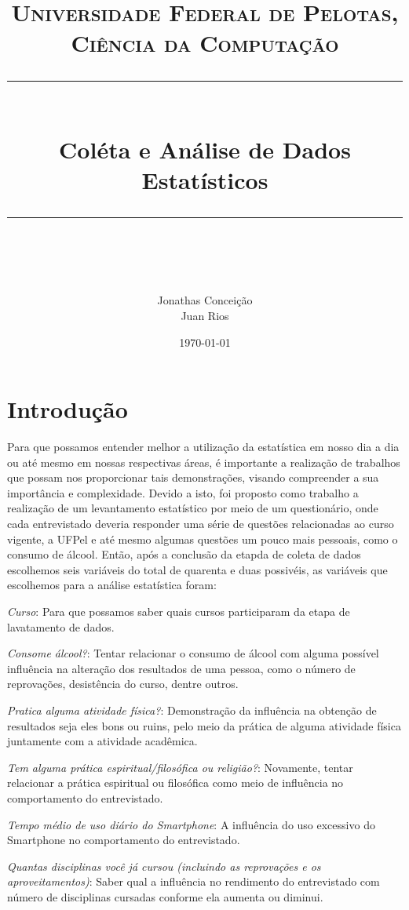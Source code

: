 \documentclass[11pt]{scrartcl} %
\title{
  \normalfont\normalsize
  \textsc{Universidade Federal de Pelotas, Ciência da Computação}\\ %
  \vspace{25pt} %
  \rule{\linewidth}{0.5pt}\\ %
  \vspace{20pt} %
  {\huge Coléta e Análise de Dados Estatísticos}\\ %
  \vspace{12pt} %
  \rule{\linewidth}{2pt}\\ %
  \vspace{12pt} %
}
\author{
  \LARGE Jonathas Conceição\\
  \LARGE Juan Rios
}
\date{\normalsize\today} %
\begin{document}
\maketitle %


\section{Introdução}

Para que possamos entender melhor a utilização da estatística em nosso dia a dia ou até mesmo em nossas respectivas áreas, é importante a realização de trabalhos que possam nos proporcionar tais demonstrações, visando compreender a sua importância e complexidade. Devido a isto, foi proposto como trabalho a realização de um levantamento estatístico por meio de um questionário, onde cada entrevistado deveria responder uma série de questões relacionadas ao curso vigente, a UFPel e até mesmo algumas questões um pouco mais pessoais, como o consumo de álcool. Então, após a conclusão da etapda de coleta de dados escolhemos seis variáveis do total de quarenta e duas possivéis, as variáveis que escolhemos para a análise estatística foram:
\item[\textit{Curso}:] Para que possamos saber quais cursos participaram da etapa de lavatamento de dados.

\item[\textit{Consome álcool?}:] Tentar relacionar o consumo de álcool com alguma possível influência na alteração dos resultados de uma pessoa, como o número de reprovações, desistência do curso, dentre outros.

\item[\textit{Pratica alguma atividade física?}:] Demonstração da influência na obtenção de resultados seja eles bons ou ruins, pelo meio da prática de alguma atividade física juntamente com a atividade acadêmica.

\item[\textit{Tem alguma prática espiritual/filosófica ou religião?}:] Novamente, tentar relacionar a prática espiritual ou filosófica como meio de influência no comportamento do entrevistado.

\item[\textit{Tempo médio de uso diário do Smartphone}:] A influência do uso excessivo do Smartphone no comportamento do entrevistado.

\item[\textit{Quantas disciplinas você já cursou (incluindo as reprovações e os aproveitamentos)}:]  Saber qual a influência no rendimento do entrevistado com número de disciplinas cursadas conforme ela aumenta ou diminui.
\end{document}
